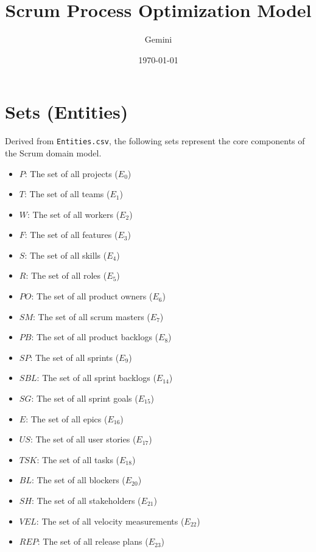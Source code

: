 \documentclass{article}
\title{Scrum Process Optimization Model}
\author{Gemini}
\date{\today}
\begin{document}
\maketitle
\tableofcontents
\newpage

\section{Sets (Entities)}
Derived from \texttt{Entities.csv}, the following sets represent the core components of the Scrum domain model.
\begin{itemize}
    \item $P$: The set of all projects ($E_0$)
    \item $T$: The set of all teams ($E_1$)
    \item $W$: The set of all workers ($E_2$)
    \item $F$: The set of all features ($E_3$)
    \item $S$: The set of all skills ($E_4$)
    \item $R$: The set of all roles ($E_5$)
    \item $PO$: The set of all product owners ($E_6$)
    \item $SM$: The set of all scrum masters ($E_7$)
    \item $PB$: The set of all product backlogs ($E_8$)
    \item $SP$: The set of all sprints ($E_9$)
    \item $SBL$: The set of all sprint backlogs ($E_{14}$)
    \item $SG$: The set of all sprint goals ($E_{15}$)
    \item $E$: The set of all epics ($E_{16}$)
    \item $US$: The set of all user stories ($E_{17}$)
    \item $TSK$: The set of all tasks ($E_{18}$)
    \item $BL$: The set of all blockers ($E_{20}$)
    \item $SH$: The set of all stakeholders ($E_{21}$)
    \item $VEL$: The set of all velocity measurements ($E_{22}$)
    \item $REP$: The set of all release plans ($E_{23}$)
\end{itemize}
\end{document}
